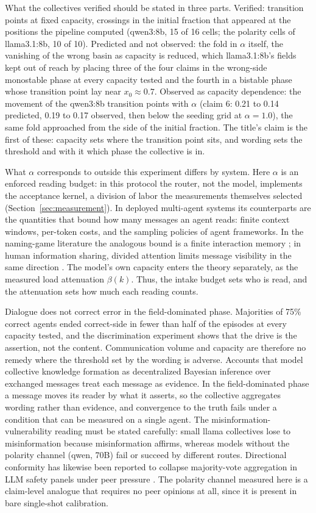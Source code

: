 \documentclass{ieeeaccess}
\begin{document}
What the collectives verified should be stated in three parts. Verified:
transition points at fixed capacity, crossings in the initial fraction that
appeared at the positions the pipeline computed (qwen3:8b, 15 of 16 cells;
the polarity cells of llama3.1:8b, 10 of 10). Predicted and not observed:
the fold in $\alpha$ itself, the vanishing of the wrong basin as capacity
is reduced, which llama3.1:8b's fields kept out of reach by placing three
of the four claims in the wrong-side monostable phase at every capacity
tested and the fourth in a bistable phase whose transition point lay near
$x_0 \approx 0.7$. Observed as capacity dependence: the movement of the
qwen3:8b transition points with $\alpha$ (claim 6: 0.21 to 0.14 predicted,
0.19 to 0.17 observed, then below the seeding grid at $\alpha = 1.0$), the
same fold approached from the side of the initial fraction. The title's
claim is the first of these: capacity sets where the transition point sits,
and wording sets the threshold and with it which phase the collective is
in.

What $\alpha$ corresponds to outside this experiment differs by system.
Here $\alpha$ is an enforced reading budget: in this protocol the router,
not the model, implements the acceptance kernel, a division of labor the
measurements themselves selected (Section~\ref{sec:measurement}). In
deployed multi-agent systems its counterparts are the quantities that bound
how many messages an agent reads: finite context windows, per-token costs,
and the sampling policies of agent frameworks. In the naming-game
literature the analogous bound is a finite interaction memory
\cite{Flint2026}; in human information sharing, divided attention limits
message visibility in the same direction \cite{HodasLerman2012}. The
model's own capacity enters the theory separately, as the measured load
attenuation $\beta(k)$. Thus, the intake budget sets who is read, and the
attenuation sets how much each reading counts.

Dialogue does not correct error in the field-dominated phase. Majorities of
75\% correct agents ended correct-side in fewer than half of the episodes
at every capacity tested, and the discrimination experiment shows that the
drive is the assertion, not the content. Communication volume and capacity
are therefore no remedy where the threshold set by the wording is adverse.
Accounts that model collective knowledge formation as decentralized
Bayesian inference over exchanged messages \cite{Taniguchi2024} treat
each message as evidence. In the field-dominated phase a message moves its
reader by what it asserts, so the collective aggregates wording rather than
evidence, and convergence to the truth fails under a condition that can be
measured on a single agent. The misinformation-vulnerability reading must
be
stated carefully: small llama collectives lose to misinformation because
misinformation affirms, whereas models without the polarity channel (qwen,
70B) fail or succeed by different routes. Directional conformity has
likewise been reported to collapse majority-vote aggregation in LLM safety
panels under peer pressure \cite{HuQu2026}. The polarity channel measured
here is a claim-level analogue that requires no peer opinions at all, since
it is present in bare single-shot calibration.
\end{document}
